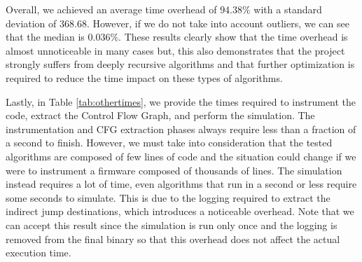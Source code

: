 Overall, we achieved an average time overhead of $94.38\%$ with a standard
deviation of $368.68$. However, if we do not take into account outliers, we can see
that the median is $0.036\%$. These results clearly show that the time overhead
is almost unnoticeable in many cases but, this also demonstrates that the project
strongly suffers from deeply recursive algorithms and that further optimization is
required to reduce the time impact on these types of algorithms.

Lastly, in Table \ref{tab:othertimes}, we provide the times required to instrument
the code, extract the Control Flow Graph, and perform the simulation. The
instrumentation and CFG extraction phases always require less than a fraction of
a second to finish. However, we must take into consideration that the tested
algorithms are composed of few lines of code and the situation could change if
we were to instrument a firmware composed of thousands of lines. The simulation instead
requires a lot of time, even algorithms that run in a second or less require
some seconds to simulate. This is due to the logging required to extract the indirect
jump destinations, which introduces a noticeable overhead. Note that we can accept
this result since the simulation is run only once and the logging is removed from
the final binary so that this overhead does not affect the actual execution time.


